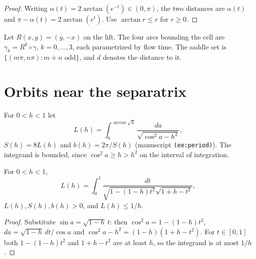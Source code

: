 \begin{proof}
\leanok
Writing $\alpha(t)=2\arctan(e^{-t})\in(0,\pi)$, the two distances are
$\alpha(t)$ and $\pi-\alpha(t)=2\arctan(e^t)$.
Use $\arctan r\le r$ for $r\ge0$.
\end{proof}

\begin{definition}
\label{def:cell-arcs}
\leanok
Let $R(x,y)=(y,-x)$ on the lift. The four arcs bounding the cell are
$\gamma_k=R^k\circ\gamma$, $k=0,\dots,3$, each parametrized by flow time. The saddle set
is $\{(m\pi,n\pi):m+n\text{ odd}\}$, and $d$ denotes the distance to it.
\end{definition}

\section{Orbits near the separatrix}

\begin{definition}
\label{def:period}
\leanok
For $0<h<1$ let
\[
  L(h)=\int_0^{\arccos\sqrt h}\frac{da}{\sqrt{\cos^2a-h^2}},
\]
$S(h)=8L(h)$ and $b(h)=2\pi/S(h)$ (manuscript \texttt{(ee:period)}). The
integrand is bounded, since $\cos^2a\ge h>h^2$ on the interval of integration.
\end{definition}

\begin{lemma}
\label{lem:period-integral}
\leanok
For $0<h<1$,
\[
  L(h)=\int_0^1\frac{dt}{\sqrt{1-(1-h)t^2}\sqrt{1+h-t^2}},
\]
$L(h),S(h),b(h)>0$, and $L(h)\le1/h$.
\end{lemma}

\begin{proof}
\leanok
Substitute $\sin a=\sqrt{1-h}\,t$: then $\cos^2a=1-(1-h)t^2$,
$da=\sqrt{1-h}\,dt/\cos a$ and $\cos^2a-h^2=(1-h)(1+h-t^2)$. For $t\in[0,1]$ both
$1-(1-h)t^2$ and $1+h-t^2$ are at least $h$, so the integrand is at most $1/h$.
\end{proof}

